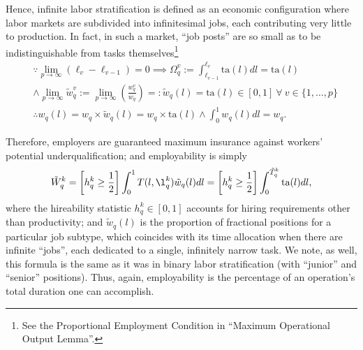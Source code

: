 \documentclass[hidelinks, nonatbib]{elsarticle}
\begin{document}
Hence, infinite labor stratification is defined as an economic configuration where labor markets are subdivided into infinitesimal jobs, each contributing very little to production. In fact, in such a market, ``job posts'' are so small as to be indistinguishable from tasks themselves\footnote{See the Proportional Employment Condition in ``Maximum Operational Output Lemma''.}
\begin{align}
    &
    \because
    \lim_{p \rightarrow \infty}{
        \left(
            \ell_{v}
            -
            \ell_{v-1}
        \right)
    }
    =
    0
    \implies
    \Omega_{q}^{v}
    :=
    \int_{
        \ell_{v-1}
    }^{
        \ell_{v}
    }
    \text{ta}(l)dl
    =
    \text{ta}(l)
    \\
    &
    \land
    \lim_{p \rightarrow \infty}{
        \tilde{w}_{q}^{v}
    }
    := 
    \lim_{p \rightarrow \infty}{
        \left(
            \frac{
                w_{q}^{v}
            }{
                w_q
            }
        \right)
    }
    =:
    \tilde{w}_{q}(l)
    =
    \text{ta}(l)
    \in [0,1]
    \
    \forall
    \
    v \in \{1, \dots, p\}
    \\
    &
    \therefore
    w_{q}(l)
    = 
    w_q \times \tilde{w}_{q}(l)
    =
    w_q \times \text{ta}(l)
    \land
    \int_{0}^{1}{
        w_{q}(l)
        dl
    }
    =
    w_q
    .
    \end{align}
    
Therefore, employers are guaranteed maximum insurance against workers' potential underqualification; and employability is simply
\begin{gather}
\tilde{W}_{q}^{k} 
= 
\left[
    h_{q}^{k}
    \geq
    \frac{1}{2}
\right]
\int_{0}^{1}
T(l, \l_{q}^{k})
\tilde{w}_{q}(l)
dl
= 
\left[
    h_{q}^{k}
    \geq
    \frac{1}{2}
\right]
\int_{0}^{\tilde{T}_{q}^{k}}
\text{ta}(l)
dl
,
\end{gather}
where the hireability statistic $h_{q}^{k} \in [0,1]$ accounts for hiring requirements other than productivity; and $\tilde{w}_{q}(l)$ is the proportion of fractional positions for a particular job subtype, which coincides with its time allocation when there are infinite ``jobs'', each dedicated to a single, infinitely narrow task. We note, as well, this formula is the same as it was in binary labor stratification (with ``junior'' and ``senior'' positions). Thus, again, employability is the percentage of an operation's total duration one can accomplish. 
\end{document}
